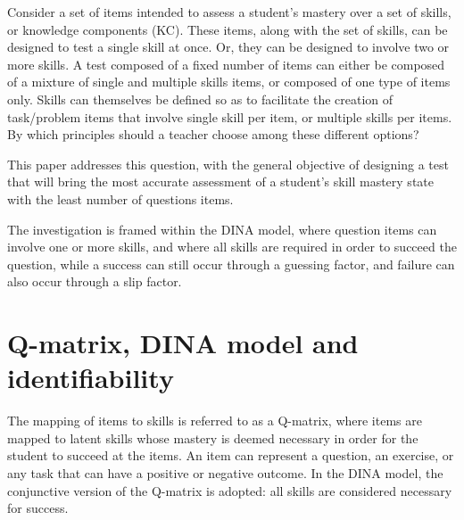 \documentclass{edm_template}
\begin{document}
Consider a set of items intended to assess a student's mastery over a set of skills, or knowledge components (KC).  These items, along with the set of skills, can be designed to test a single skill at once.  Or, they can be designed to involve two or more skills.  A test composed of a fixed number of items can either be composed of a mixture of single and multiple skills items, or composed of one type of items only.  Skills can themselves be defined so as to facilitate the creation of task/problem items that involve single skill per item, or multiple skills per items.  By which principles should a teacher choose among these different options?

This paper addresses this question, with the general objective of designing a test that will bring the most accurate assessment of a student's skill mastery state with the least number of questions items.  

The investigation is framed within the DINA model, where question items can involve one or more skills, and where all skills are required in order to succeed the question, while a success can still occur through a guessing factor, and failure can also occur through a slip factor.  


\section{Q-matrix, DINA model and identifiability}\label{sec:q-matrix-dina}

The mapping of items to skills is referred to as a Q-matrix, where items are mapped to latent skills whose mastery is deemed necessary in order for the student to succeed at the items.  An item can represent a question, an exercise, or any task that can have a positive or negative outcome.  In the DINA model, the conjunctive version of the Q-matrix is adopted: all skills are considered necessary for success.
\end{document}
